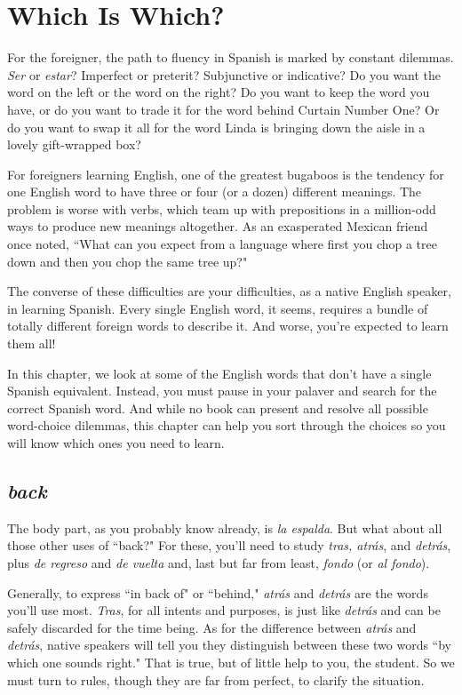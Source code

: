 \chapter{Which Is Which?}

For the foreigner, the path to fluency in Spanish is marked by
constant dilemmas. \emph{Ser} or \emph{estar}? Imperfect or preterit? Subjunctive
or indicative? Do you want the word on the left or the word on the
right? Do you want to keep the word you have, or do you want to trade
it for the word behind Curtain Number One? Or do you want to swap
it all for the word Linda is bringing down the aisle in a lovely gift-wrapped box?

For foreigners learning English, one of the greatest bugaboos
is the tendency for one English word to have three or four (or a dozen)
different meanings. The problem is worse with verbs, which team up
with prepositions in a million-odd ways to produce new meanings altogether. As an exasperated Mexican friend once noted, ``What can you
expect from a language where first you chop a tree down and then you
chop the same tree up?"

The converse of these difficulties are your difficulties, as a native English speaker, in learning Spanish. Every single English word, it
seems, requires a bundle of totally different foreign words to describe
it. And worse, you're expected to learn them all!

In this chapter, we look at some of the English words that
don't have a single Spanish equivalent. Instead, you must pause in your
palaver and search for the correct Spanish word. And while no book
can present and resolve all possible word-choice dilemmas, this chapter can help you sort through the choices so you will know which ones
you need to learn.

\section{\emph{back}}

The body part, as you probably know already, is \emph{la espalda}.
But what about all those other uses of ``back?" For these, you'll need
to study \emph{tras, atrás}, and \emph{detrás}, plus \emph{de regreso} and \emph{de vuelta} and, last
but far from least, \emph{fondo} (or \emph{al fondo}).

Generally, to express ``in back of" or ``behind," \emph{atrás} and \emph{detrás} are the words you'll use most. \emph{Tras}, for all intents and purposes, is
just like \emph{detrás} and can be safely discarded for the time being. As for
the difference between \emph{atrás} and \emph{detrás}, native speakers will tell you
they distinguish between these two words ``by which one sounds right."
That is true, but of little help to you, the student. So we must turn to
rules, though they are far from perfect, to clarify the situation.

